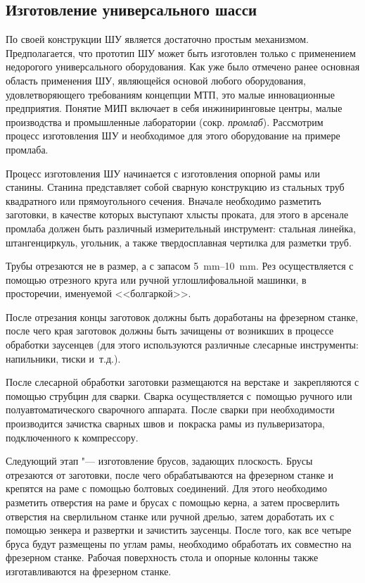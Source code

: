 \subsection{Изготовление универсального шасси}

По своей конструкции ШУ является достаточно простым механизмом. Предполагается, что прототип ШУ может быть изготовлен только с применением недорогого универсального оборудования. Как уже было отмечено ранее основная область применения ШУ, являющейся основой любого оборудования, удовлетворяющего требованиям концепции МТП, это малые инновационные предприятия. Понятие МИП включает в себя инжиниринговые центры, малые производства и промышленные лаборатории (сокр. \textit{промлаб}). Рассмотрим процесс изготовления ШУ и необходимое для этого оборудование на примере промлаба.

Процесс изготовления ШУ начинается с изготовления опорной рамы или станины. Станина представляет собой сварную конструкцию из стальных труб квадратного или прямоугольного сечения. Вначале необходимо разметить заготовки, в качестве которых выступают хлысты проката, для этого в арсенале промлаба должен быть различный измерительный инструмент: стальная линейка, штангенциркуль, угольник, а также твердосплавная чертилка для разметки труб.

Трубы отрезаются не в размер, а с запасом \SIrange{5}{10}{\milli\metre}. Рез осуществляется с помощью отрезного круга или ручной углошлифовальной машинки, в просторечии, именуемой <<болгаркой>>.

После отрезания концы заготовок должны быть доработаны на фрезерном станке, после чего края заготовок должны быть зачищены от возникших в процессе обработки заусенцев (для этого используются различные слесарные инструменты: напильники, тиски и~т.\:д.).

После слесарной обработки заготовки размещаются на верстаке и~закрепляются с помощью струбцин для сварки. Сварка осуществляется с~помощью ручного или полуавтоматического сварочного аппарата. После сварки при необходимости производится зачистка сварных швов и~покраска рамы из пульверизатора, подключенного к компрессору.

Следующий этап "--- изготовление брусов, задающих плоскость. Брусы отрезаются от заготовки, после чего обрабатываются на фрезерном станке и крепятся на раме с помощью болтовых соединений. Для этого необходимо разметить отверстия на раме и брусах с помощью керна, а затем просверлить отверстия на сверлильном станке или ручной дрелью, затем доработать их с помощью зенкера и развертки и зачистить заусенцы. После того, как все четыре бруса будут размещены по углам рамы, необходимо обработать их совместно на фрезерном станке. Рабочая поверхность стола и опорные колонны также изготавливаются на фрезерном станке.

